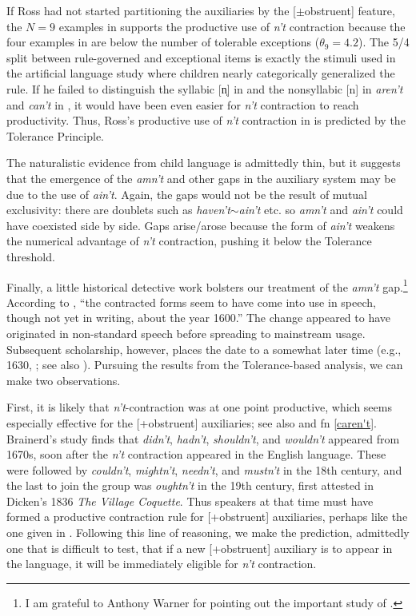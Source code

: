 \documentclass[output=paper,
modfonts
]{LSP/langsci}
\begin{document}
If Ross had not started partitioning the auxiliaries by the
[$\pm$obstruent] feature, the $N=9$ examples in  supports
the productive use of \textit{n't} contraction because the four examples
in  are below the number of tolerable exceptions
($\theta_9 = 4.2$). The 5/4 split between rule-governed and
exceptional items is exactly the stimuli used in the artificial
language study \citep{Schuler2016} where children nearly categorically
generalized the rule. If he failed to distinguish the syllabic [n̩] in
 and the nonsyllabic [n] in \textit{aren't} and \textit{can't}
in , it would have been even easier for \textit{n't}
contraction to reach productivity.  Thus, Ross's productive use of \textit{n't}
contraction in  is  predicted by the Tolerance
Principle. 

The naturalistic evidence from child language  is admittedly thin, but it suggests that
the emergence of the \textit{amn't} and other gaps in 
the auxiliary system may be due to the use of \textit{ain't}. Again, the
gaps would not be the result of mutual exclusivity: there are doublets
such as \textit{haven't}$\sim$\textit{ain't} etc. so \textit{amn't} and
\textit{ain't} could have coexisted side by side. Gaps arise/arose
because the form of \textit{  ain't} weakens the numerical advantage of
\textit{n't} contraction, pushing it below the Tolerance threshold. 

Finally, a little historical detective work bolsters our treatment of 
the \textit{amn't} gap.\footnote{I am grateful to Anthony Warner for pointing
  out the important study of \citealt{Brainerd1989}.} 
According to \citet[][p117]{Jespersen1917}, ``the contracted forms seem to
have come into use in speech, though not yet in writing, about the
year 1600.'' The change appeared to have originated in non-standard
speech before spreading to mainstream usage.  Subsequent scholarship, however, places the date to a
somewhat later time (e.g., 1630, \citealt[][p181]{Brainerd1989}; see
also \citealt[][p208-9]{Warner1993}).
Pursuing the results from the Tolerance-based analysis, we can make
two observations.   

First, it is likely that \textit{n't}-contraction was at one point
productive, which seems especially effective for the [+obstruent]
auxiliaries; see also  and fn \ref{caren't}.
Brainerd's study finds  that \textit{didn't}, \textit{hadn't}, \textit{shouldn't}, and \textit{wouldn't} appeared from 1670s, soon after the
\textit{n't} contraction appeared in the English language. These were
followed  by \textit{couldn't}, \textit{mightn't}, \textit{needn't}, and \textit{mustn't} in the 18th century, and the last to join the group was
\textit{oughtn't} in the 19th century, first attested in Dicken's 1836
\textit{The Village 
  Coquette}. 
  Thus  speakers at  that time  must have formed a  productive
  contraction rule  for [+obstruent] auxiliaries, perhaps like the one
  given in .  
Following this line of reasoning, we  make the prediction, admittedly
one that is difficult to test, that if a new [+obstruent] auxiliary is
to appear in the language, it will be immediately eligible for \textit{n't} contraction.  
\end{document}
